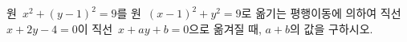 원~$x^2+(y-1)^2=9$를 원~$(x-1)^2+y^2=9$로 옮기는 평행이동에 의하여 직선~$x+2y-4=0$이 직선~$x+ay+b=0$으로 옮겨질 때, $a+b$의 값을 구하시오. 
